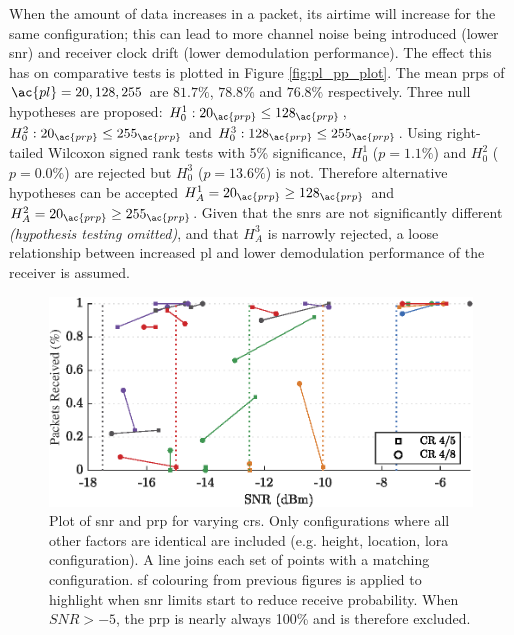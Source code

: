 When the amount of data increases in a packet, its airtime will increase for the same configuration; this can lead to more channel noise being introduced (lower \ac{snr}) and receiver clock drift (lower demodulation performance). The effect this has on comparative tests is plotted in Figure \ref{fig:pl_pp_plot}. The mean \ac{prp}s of $\ac{pl} = 20, 128, 255$ are $81.7\%$, $78.8\%$ and $76.8\%$ respectively.  Three null hypotheses are proposed: $H^1_{0} : 20_{\ac{prp}} \leq 128_{\ac{prp}}$, $H^2_{0} : 20_{\ac{prp}} \leq 255_{\ac{prp}}$ and $H^3_{0} : 128_{\ac{prp}} \leq 255_{\ac{prp}}$. Using right-tailed Wilcoxon signed rank tests with 5\% significance, $H^1_{0}$ ($p=1.1\%$) and $H^2_{0}$ ($p=0.0\%$) are rejected but $H^3_{0}$ ($p=13.6\%$) is not. Therefore alternative hypotheses can be accepted  $H^1_{A}=20_{\ac{prp}} \geq 128_{\ac{prp}}$ and $H^2_{A}=20_{\ac{prp}} \geq 255_{\ac{prp}}$. Given that the \ac{snr}s are not significantly different \textit{(hypothesis testing omitted)}, and that $H^3_{A}$ is narrowly rejected, a loose relationship between increased \ac{pl} and lower demodulation performance of the receiver is assumed.
\begin{figure}[H]
    \centering
   	\includegraphics{Figures/cr_pp_plot}
    \caption[Effect of Coding Rate on \ac{snr} and \ac{prp}]{
    Plot of \ac{snr} and \ac{prp} for varying \ac{cr}s. Only configurations where all other factors are identical are included (e.g. height, location, \ac{lora} configuration). A line joins each set of points with a matching configuration. \ac{sf} colouring from previous figures is applied to highlight when \ac{snr} limits start to reduce receive probability. When $SNR > -5$, the \ac{prp} is nearly always 100\% and is therefore excluded.
    }
    \label{fig:cr_pp_plot}
\end{figure}

